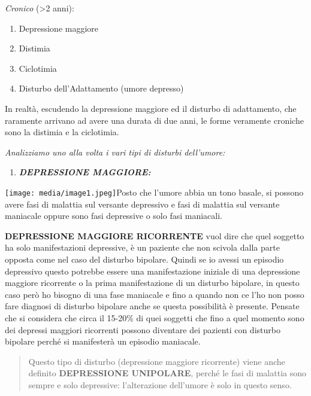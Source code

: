 \documentclass[]{article}
\begin{document}
\emph{Cronico} (\textgreater{}2 anni):

\begin{enumerate}
\def\labelenumi{\arabic{enumi}.}
\item
  Depressione maggiore
\item
  Distimia
\item
  Ciclotimia
\item
  Disturbo dell'Adattamento (umore depresso)
\end{enumerate}

In realtà, escudendo la depressione maggiore ed il disturbo di
adattamento, che raramente arrivano ad avere una durata di due anni, le
forme veramente croniche sono la distimia e la ciclotimia.

\emph{Analizziamo uno alla volta i vari tipi di disturbi dell'umore:}

\begin{enumerate}
\def\labelenumi{\arabic{enumi}.}
\item
  \textbf{\emph{DEPRESSIONE MAGGIORE:}}
\end{enumerate}

\texttt{[image: media/image1.jpeg]}Posto
che l'umore abbia un tono basale, si possono avere fasi di malattia sul
versante depressivo e fasi di malattia sul versante maniacale oppure
sono fasi depressive o solo fasi maniacali.

\textbf{DEPRESSIONE MAGGIORE RICORRENTE} vuol dire che quel soggetto ha
solo manifestazioni depressive, è un paziente che non scivola dalla
parte opposta come nel caso del disturbo bipolare. Quindi se io avessi
un episodio depressivo questo potrebbe essere una manifestazione
iniziale di una depressione maggiore ricorrente o la prima
manifestazione di un disturbo bipolare, in questo caso però ho bisogno
di una fase maniacale e fino a quando non ce l'ho non posso fare
diagnosi di disturbo bipolare anche se questa possibilità è presente.
Pensate che si considera che circa il 15-20\% di quei soggetti che fino
a quel momento sono dei depressi maggiori ricorrenti possono diventare
dei pazienti con disturbo bipolare perché si manifesterà un episodio
maniacale.

\begin{quote}
Questo tipo di disturbo (depressione maggiore ricorrente) viene anche
definito \textbf{DEPRESSIONE UNIPOLARE}, perché le fasi di malattia sono
sempre e solo depressive: l'alterazione dell'umore è solo in questo
senso.
\end{quote}
\end{document}
